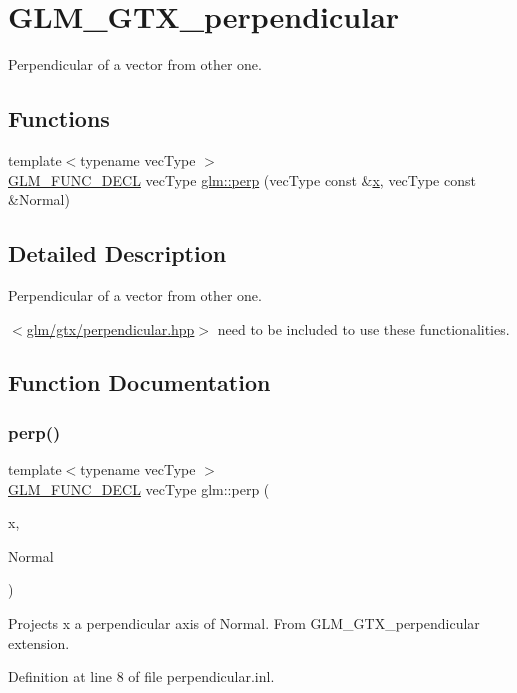 \hypertarget{group__gtx__perpendicular}{}\section{G\+L\+M\+\_\+\+G\+T\+X\+\_\+perpendicular}
\label{group__gtx__perpendicular}


Perpendicular of a vector from other one.  


\subsection*{Functions}
\begin{DoxyCompactItemize}
\item 
{\footnotesize template$<$typename vec\+Type $>$ }\\\mbox{\hyperlink{setup_8hpp_ab2d052de21a70539923e9bcbf6e83a51}{G\+L\+M\+\_\+\+F\+U\+N\+C\+\_\+\+D\+E\+CL}} vec\+Type \mbox{\hyperlink{group__gtx__perpendicular_ga41f8c73da9798a18e6b1e32f1e301f07}{glm\+::perp}} (vec\+Type const \&\mbox{\hyperlink{glad_8h_a92d0386e5c19fb81ea88c9f99644ab1d}{x}}, vec\+Type const \&Normal)
\end{DoxyCompactItemize}


\subsection{Detailed Description}
Perpendicular of a vector from other one. 

$<$\mbox{\hyperlink{perpendicular_8hpp}{glm/gtx/perpendicular.\+hpp}}$>$ need to be included to use these functionalities. 

\subsection{Function Documentation}
\mbox{\label{group__gtx__perpendicular_ga41f8c73da9798a18e6b1e32f1e301f07}} 
\subsubsection{\texorpdfstring{perp()}{perp()}}
{\footnotesize\ttfamily template$<$typename vec\+Type $>$ \\
\mbox{\hyperlink{setup_8hpp_ab2d052de21a70539923e9bcbf6e83a51}{G\+L\+M\+\_\+\+F\+U\+N\+C\+\_\+\+D\+E\+CL}} vec\+Type glm\+::perp (\begin{DoxyParamCaption}\item[{vec\+Type const \&}]{x,  }\item[{vec\+Type const \&}]{Normal }\end{DoxyParamCaption})}

Projects x a perpendicular axis of Normal. From G\+L\+M\+\_\+\+G\+T\+X\+\_\+perpendicular extension. 

Definition at line 8 of file perpendicular.\+inl.

